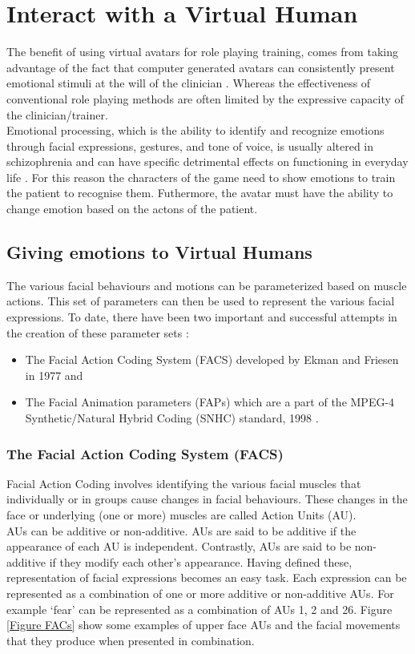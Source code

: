\documentclass[11pt]{article}
\begin{document}
\section{Interact with a Virtual Human}
The benefit of using virtual avatars for role playing training, comes from taking advantage of the fact that computer generated avatars can consistently present emotional stimuli at the will of the clinician \cite{Kim11}. Whereas the effectiveness of conventional role playing methods are often limited by the expressive capacity of the clinician/trainer. \\

Emotional processing, which is the ability to identify and recognize emotions through facial expressions, gestures, and tone of voice, is usually altered in schizophrenia and can have specific detrimental effects on functioning in everyday life \cite{Peyroux14}. For this reason the characters of the game need to show emotions to train the patient to recognise them. Futhermore, the avatar must have the ability to change emotion based on the actons of the patient.
 \subsection{Giving emotions to Virtual Humans}
The various facial behaviours and motions can be parameterized based on muscle actions. This set of parameters can then be used to represent the various facial expressions. To date, there have been two important and successful attempts in the creation of these parameter sets \cite{Bettadapura12}:
\begin{itemize}
\item The Facial Action Coding System (FACS) developed by Ekman and Friesen in 1977 \cite{Ekman77} and
\item The Facial Animation parameters (FAPs) which are a part of the MPEG-4 Synthetic/Natural Hybrid Coding (SNHC) standard, 1998 \cite{Pandzic03}.
\end{itemize}
\subsubsection{The Facial Action Coding System (FACS)}
Facial Action Coding involves identifying the various facial muscles that individually or in groups cause changes in facial behaviours. These changes in the face or underlying (one or more) muscles are called Action Units (AU). \\

AUs can be additive or non-additive. AUs are said to be additive if the appearance of each AU is independent. Contrastly, AUs are said to be non-additive if they modify each other’s appearance. Having defined these, representation of facial expressions becomes an easy task. Each expression can be represented as a combination of one or more additive or non-additive AUs. For example ‘fear’ can be represented as a combination of AUs 1, 2 and 26. Figure \ref{Figure FACs} show some examples of upper face AUs and the facial movements that they produce when presented in combination.
\end{document}
